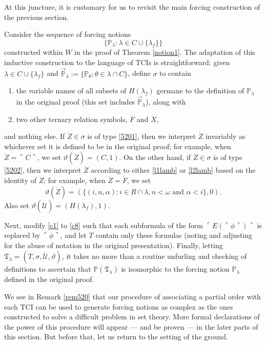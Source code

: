 \documentclass[12pt]{article}
\numberwithin{equation}{section}
\begin{document}
At this juncture, it is customary for us to revisit the main forcing construction of the previous section.

\begin{rem}\label{rem520}
Consider the sequence of forcing notions $$\{\mathbb{P}_{\lambda} : \lambda \in C \cup \{\lambda_f\}\}$$ constructed within $W$ in the proof of Theorem \ref{notion1}. The adaptation of this inductive construction to the language of TCIs is straightforward: given $\lambda \in C \cup \{\lambda_f\}$ and $\Vec{\mathbb{P}}_{\lambda} := \{\mathbb{P}_{\theta} : \theta \in \lambda \cap C\}$, define $\sigma$ to contain
\begin{enumerate}[label=(\Alph*)]
    \item\label{5201} the variable names of all subsets of $H(\lambda_f)$ germane to the definition of $\mathbb{P}_{\lambda}$ in the original proof (this set includes $\Vec{\mathbb{P}}_{\lambda}$), along with
    \item\label{5202} two other ternary relation symbols, $\dot{F}$ and $\dot{X}$,
\end{enumerate}
and nothing else. If $\dot{Z} \in \sigma$ is of type \ref{5201}, then we interpret $\dot{Z}$ invariably as whichever set it is defined to be in the original proof; for example, when $\dot{Z} = \ulcorner C \urcorner$, we set $\vartheta (\dot{Z}) = (C, 1)$. On the other hand, if $\dot{Z} \in \sigma$ is of type \ref{5202}, then we interpret $\dot{Z}$ according to either \ref{l1lamb} or \ref{l2lamb} based on the identity of $\dot{Z}$; for example, when $\dot{Z} = \dot{F}$,  we set $$\vartheta (\dot{Z}) = (\{(i, n, \alpha) : i \in R \cap \lambda, n < \omega \text{ and } \alpha < i\}, 0).$$ Also set $\vartheta (\dot{\mathcal{U}}) = (H(\lambda_f), 1)$. 

Next, modify \ref{c1} to \ref{c8} such that each subformula of the form $\ulcorner E(\ulcorner \phi \urcorner) \urcorner$ is replaced by $\ulcorner \phi \urcorner$, and let $T$ contain only these formulas (noting and adjusting for the abuse of notation in the original presentation). Finally, letting $\mathfrak{T}_{\lambda} = (T, \sigma, \dot{\mathcal{U}}, \vartheta)$, it takes no more than a routine unfurling and checking of definitions to ascertain that $\mathbb{P}(\mathfrak{T}_{\lambda})$ is isomorphic to the forcing notion $\mathbb{P}_{\lambda}$ defined in the original proof.
\end{rem}

We see in Remark \ref{rem520} that our procedure of associating a partial order with each TCI can be used to generate forcing notions as complex as the ones constructed to solve a difficult problem in set theory. More formal declarations of the power of this procedure will appear --- and be proven --- in the later parts of this section. But before that, let us return to the setting of the ground.
\end{document}

